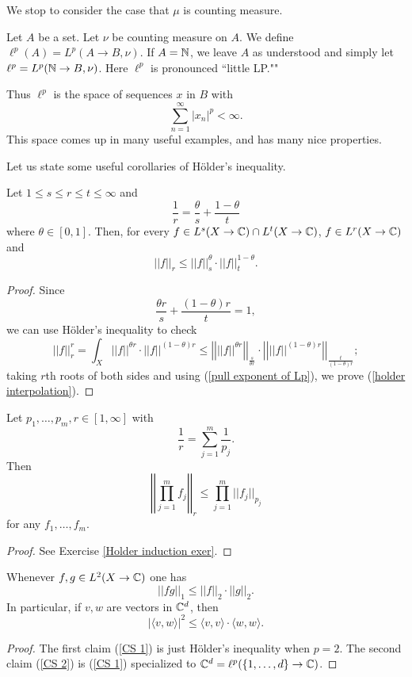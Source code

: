 We stop to consider the case that $\mu$ is counting measure.

\begin{definition}
Let $A$ be a set. Let $\nu$ be counting measure on $A$. We define $\ell^p(A) = L^p(A \to B, \nu)$.
If $A = \mathbb{N}$, we leave $A$ as understood and simply let $\ell^p = L^p(\mathbb{N} \to B, \nu)$.
Here $\ell^p$ is pronounced ``little LP.""
\end{definition}

Thus $\ell^p$ is the space of sequences $x$ in $B$ with
\[\sum_{n = 1}^\infty |x_n|^p < \infty.\]
This space comes up in many useful examples, and has many nice properties.

Let us state some useful corollaries of H\"older's inequality.
\begin{corollary}
Let $1 \leq s \leq r \leq t \leq \infty$ and
\[\frac{1}{r} = \frac{\theta}{s} + \frac{1 - \theta}{t}\]
where $\theta \in [0, 1]$. Then, for every $f \in L^s(X \to \mathbb{C}) \cap L^t(X \to \mathbb{C})$, $f \in L^r(X \to \mathbb{C})$ and
\begin{equation}
\label{holder interpolation}
||f||_r \leq ||f||_s^\theta \cdot ||f||_t^{1-\theta}.
\end{equation}
\end{corollary}
\begin{proof}
Since
\[\frac{\theta r}{s} + \frac{(1 - \theta)r}{t} = 1,\]
we can use H\"older's inequality to check
\[||f||_r^r = \int_X ||f||^{\theta r} \cdot ||f||^{(1 - \theta)r} \leq \left|\left|||f||^{\theta r}\right|\right|_{\frac{s}{\theta r}} \cdot \left|\left|||f||^{(1 - \theta) r}\right|\right|_{\frac{t}{(1 - \theta)r}};\]
taking $r$th roots of both sides and using (\ref{pull exponent of Lp}), we prove (\ref{holder interpolation}).
\end{proof}

\begin{corollary}
\label{Holder induction}
Let $p_1, \dots, p_m, r \in [1, \infty]$ with
\[\frac{1}{r} = \sum_{j=1}^m \frac{1}{p_j}.\]
Then
\[\left|\left|\prod_{j=1}^m f_j\right|\right|_r \leq \prod_{j=1}^m ||f_j||_{p_j}\]
for any $f_1, \dots, f_m$.
\end{corollary}
\begin{proof}
See Exercise \ref{Holder induction exer}.
\end{proof}

\begin{corollary}
Whenever $f, g \in L^2(X \to \mathbb{C})$ one has
\begin{equation}
\label{CS 1}
||fg||_1 \leq ||f||_2 \cdot ||g||_2.
\end{equation}
In particular, if $v, w$ are vectors in $\mathbb{C}^d$, then
\begin{equation}
\label{CS 2}
|\langle v, w\rangle|^2 \leq \langle v, v\rangle \cdot \langle w, w\rangle.
\end{equation}
\end{corollary}
\begin{proof}
The first claim (\ref{CS 1}) is just H\"older's inequality when $p = 2$.
The second claim (\ref{CS 2}) is (\ref{CS 1}) specialized to $\mathbb{C}^d = \ell^p(\{1, \dots, d\} \to \mathbb{C})$.
\end{proof}


